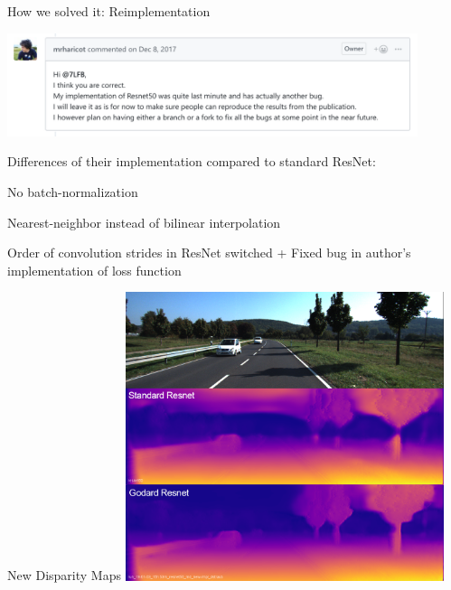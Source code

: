 \documentclass[11pt]{beamer}
\newenvironment{wideitemize}{\itemize\addtolength{\itemsep}{.75em}}{\enditemize}
\newcommand{\addsubitemspace}{\vspace{0.5em}}
\begin{document}
\begin{frame}[c]{How we solved it: Reimplementation}
\begin{center}
  \includegraphics[width=0.9\textwidth]{figures/godard-github.png}
\end{center}

\pause
\vfill

Differences of their implementation compared to standard ResNet:
\addsubitemspace
  \begin{wideitemize}
  \item No batch-normalization
  \item Nearest-neighbor instead of bilinear interpolation
  \item Order of convolution strides in ResNet switched
  \end{wideitemize}
\vfill
  {\color{tudred}+} Fixed bug in author's implementation of loss function
\end{frame}

\begin{frame}[c]{New Disparity Maps}
\centering
\includegraphics[width=0.7\textwidth]{figures/images/implementationcomparison_001.png}
\end{frame}
\end{document}
